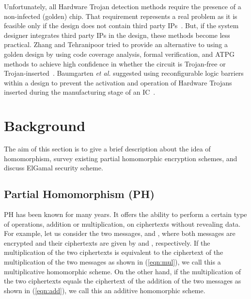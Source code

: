 \documentclass[conference]{IEEEtran}
\begin{document}
Unfortunately, all Hardware Trojan detection methods require the presence of a non-infected (golden) chip. That requirement represents a real problem as it is feasible only if the design does not contain third party IPs{\color{blue}~\cite{journal:Teh2011}}. But, if the system designer integrates third party IPs in the design, these methods become less practical. Zhang and Tehranipoor tried to provide an alternative to using a golden design by using code coverage analysis, formal verification, and ATPG methods to achieve high confidence in whether the circuit is Trojan-free or Trojan-inserted{\color{blue}~\cite{conf:zha2011}}. Baumgarten \textit{et al.} suggested using reconfigurable logic barriers within a design to prevent the activation and operation of Hardware Trojans inserted during the manufacturing stage of an IC{\color{blue}~\cite{journal:Bau2010}}. \section{Background} \label{sec:backgrnd}

The aim of this section is to give a brief description about the idea of homomorphism, survey existing partial homomorphic encryption schemes, and discuss ElGamal security scheme.

\subsection{Partial Homomorphism (PH)} \label{sub:Phomo}
PH has been known for many years. It offers the ability to perform a certain type of operations, addition or multiplication, on ciphertexts without revealing data. For example, let us consider the two messages,  and , where both messages are encrypted and their ciphertexts are given by  and , respectively. If the multiplication of the two ciphertexts is equivalent to the ciphertext of the multiplication of the two messages as shown in (\ref{eqn:mul}), we call this a multiplicative homomorphic scheme. On the other hand, if the multiplication of the two ciphertexts equals the ciphertext of the addition of the two messages as shown in (\ref{eqn:add}), we call this an additive homomorphic scheme. 

 

 
\end{document}
